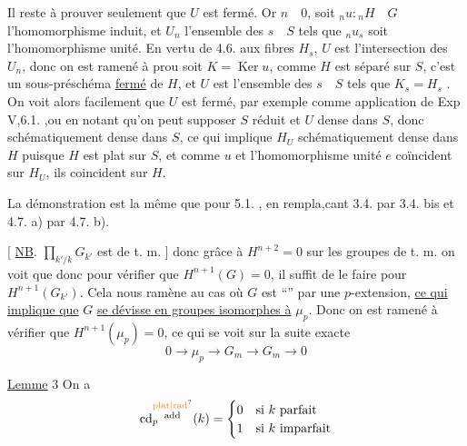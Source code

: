 Il reste à prouver seulement que $U$ est fermé. Or  $n\quad 0$, soit $ {}_nu:{}_nH\quad G$ l'homomorphisme induit, et $U_n$ l'ensemble des $s\quad S$ tels que $ {}_nu_s$ soit l'homomorphisme unité. En vertu de 4.6.  aux fibres $H_s$, $U$ est l'intersection des $U_n$, donc on est ramené à prou soit $K=\operatorname{Ker}u$, comme $H$ est séparé sur $S$, c'est un sous-préschéma \uline{fermé} de $H$, et $U$ est l'ensemble des $s\quad S$ tels que $K_s=$$H_s$ . On voit alors  facilement que $U$ est fermé, par exemple comme application de Exp V,6.1. ,ou en  notant qu'on peut supposer $S$ réduit et $U$ dense dans $S$, donc schématiquement dense dans $S$, ce qui implique $H_U$ schématiquement dense dans $H$ puisque $H$ est plat sur $S$, et comme $u$ et l'homomorphisme unité $e$ coïncident sur $H_U$, ils coincident sur $H$.

La démonstration est la même que pour 5.1. , en rempla,cant 3.4. par 3.4. bis et 4.7. a) par 4.7. b).


[ \uline{NB}. $\prod_{k'/k}G_{k'}$ est de t. m. ] donc grâce à $H^{n+2}=0$ sur les groupes de t. m. on voit que
donc pour vérifier que $H^{n+1}(G)=0$, il suffit de le faire pour $H^{n+1}(G_{k'})$. Cela nous ramène au cas où $G$ est ``'' par une $p$-extension, \uline{ce qui implique que} $G$ \uline{se dévisse en groupes isomorphes à} $\mu_p$. Donc on est ramené à vérifier que $H^{n+1}(\mu_p)=0$, ce qui se voit sur la suite exacte
\[
0\longrightarrow\mu_p\longrightarrow G_m\longrightarrow G_m\longrightarrow 0
\]

\uline{Lemme} 3  On a
\[
\operatorname{cd}^{\substack{\rm \unsure{plat|rad}\\\rm add}}_p(k)=
\begin{cases}0&\text{si }k\text{ parfait}\\1&\text{si }k\text{ imparfait}\end{cases}
\]

